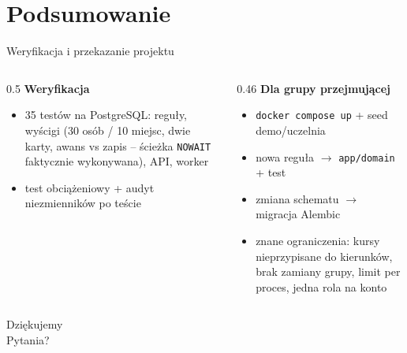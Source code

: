\documentclass[aspectratio=169,11pt]{beamer}
\begin{document}
\section{Podsumowanie}

\begin{frame}{Weryfikacja i przekazanie projektu}
  \begin{columns}[T]
    \begin{column}{0.5\textwidth}
      \small
      \textbf{Weryfikacja}
      \begin{itemize}
        \item 35 testów na PostgreSQL: reguły, wyścigi (30 osób / 10 miejsc, dwie karty, awans vs zapis -- ścieżka \texttt{NOWAIT} faktycznie wykonywana), API, worker
        \item test obciążeniowy + audyt niezmienników po teście
      \end{itemize}
    \end{column}
    \begin{column}{0.46\textwidth}
      \small
      \textbf{Dla grupy przejmującej}
      \begin{itemize}
        \item \texttt{docker compose up} + seed demo/uczelnia
        \item nowa reguła $\rightarrow$ \texttt{app/domain} + test
        \item zmiana schematu $\rightarrow$ migracja Alembic
        \item znane ograniczenia: kursy nieprzypisane do kierunków, brak zamiany grupy, limit per proces, jedna rola na konto
      \end{itemize}
    \end{column}
  \end{columns}
\end{frame}

\begin{frame}[standout]
  Dziękujemy\\[6pt]
  \normalsize Pytania?
\end{frame}
\end{document}
